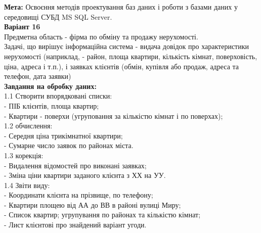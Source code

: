 \begin{normalsize}
	\textbf{Мета:} Освоєння методів проектування баз даних і роботи з базами даних у середовищі СУБД MS SQL Server.\\
	\linebreak
	\textbf{Варіант 16}\\
Предметна область - фірма по обміну та продажу нерухомості.\\
Задачі, що вирішує інформаційна система - видача довідок про
характеристики нерухомості (наприклад, - район, площа квартири, кількість
кімнат, поверховість, ціна, адреса і т.п.), і заявках клієнтів (обмін, купівля або
продаж, адреса та телефон, дата заявки)\\
\textbf{Завдання на обробку даних:}\\
1.1 Створити впорядковані списки:\\
- ПІБ клієнтів, площа квартир;\\
- Квартири - поверхи (угруповання за кількістю кімнат і по
поверхах);\\
1.2 обчислення:\\
- Середня ціна трикімнатної квартири;\\
- Сумарне число заявок по районах міста.\\
1.3 корекція:\\
- Видалення відомостей про виконані заявках;\\
- Зміна ціни квартири заданого клієнта з ХХ на УУ.\\
1.4 Звіти виду:\\
- Координати клієнта на прізвище, по телефону;\\
- Квартири площею від АА до ВВ в районі вулиці Миру;\\
- Список квартир; угрупування по районах та кількістю кімнат;\\
- Лист клієнтові про знайдений варіант угоди.\\
\end{normalsize}